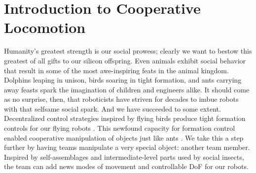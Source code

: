 \documentclass[letterpaper]{report}
\begin{document}
\section{Introduction to Cooperative Locomotion}
Humanity's greatest strength is our social prowess; clearly we want to bestow this greatest of all gifts to our silicon offspring.
Even animals exhibit social behavior that result in some of the most awe-inspiring feats in the animal kingdom.
Dolphins leaping in unison, birds soaring in tight formation, and ants carrying away feasts spark the imagination of children and engineers alike.
It should come as no surprise, then, that roboticists have striven for decades to imbue robots with that selfsame social spark.
And we have succeeded to some extent.
Decentralized control strategies inspired by flying birds \cite{reynolds1987flocks} produce tight formation controls for our flying robots \cite{RealBoids}.
This newfound capacity for formation control enabled cooperative manipulation of objects \cite{rus1995moving,sugar2002control,spletzer2001cooperative,song2002potential} just like ants \cite{kube2000cooperative}.
We take this a step further by having teams manipulate a very special object: another team member.
Inspired by self-assemblages \cite{Anderson2002} and intermediate-level parts \cite{Anderson2001} used by social insects, the team can add news modes of movement and controllable DoF for our robots.
\end{document}
